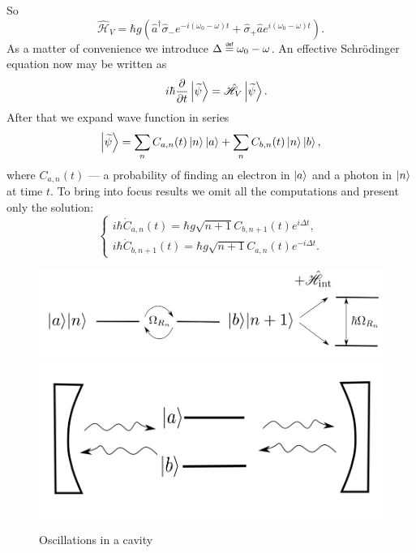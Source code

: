 So
\begin{equation}
	\hat{\mathscr{H}}_V = \hbar g \left( \hat{a}^{\dagger} \hat{\sigma}_- e^{-i (\omega_0 - \omega)t} + \hat{\sigma}_+ \hat{a} e^{i (\omega_0 - \omega)t} \right).
\end{equation}
As a matter of convenience we introduce $\Delta \myeq \omega_0 - \omega$. An effective Schrödinger equation now may be written as
\begin{equation}
	\quad i \hbar \dfrac{\partial {}}{\partial {t}}\left\lvert {\widetilde{\psi}} \right\rangle = \hat{\mathscr{H}}_V \left\lvert {\widetilde{\psi}} \right\rangle.
\end{equation}
After that we expand wave function in series 
\begin{equation}
	\left\lvert {\widetilde{\psi}} \right\rangle = \sum_{n} C_{a,n}(t) \left\lvert {n} \right\rangle \left\lvert {a} \right\rangle + \sum_{n} C_{b,n}(t) \left\lvert {n} \right\rangle \left\lvert {b} \right\rangle,
\end{equation}
where $C_{a,n}(t)$ --- a probability of finding an electron in $\left\lvert {a} \right\rangle$ and a photon in $\left\lvert {n} \right\rangle$ at time $t$. To bring into focus results we omit all the computations and present only the solution:
\begin{equation}
	\begin{cases}
		i \hbar \dot{C}_{a,n}(t) = \hbar g \sqrt{n+1} C_{b,n+1}(t) e^{i \Delta t}, \\
		i \hbar \dot{C}_{b,n+1}(t) = \hbar g \sqrt{n+1} C_{a,n}(t) e^{-i \Delta t}.
	\end{cases}
	\label{eq:228_botat_my_ne_brosim}
\end{equation}

\begin{figure}
	\centering
	\includegraphics[width=0.8\linewidth]{fig/L6/E_split}
	\includegraphics[width=0.5\linewidth]{fig/L6/osc_in_cavity}
	\caption{Oscillations in a cavity}
	\label{fig:228}
\end{figure}


